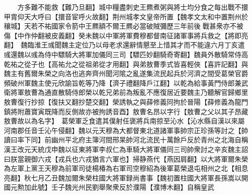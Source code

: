 　　方多難不能救【難乃旦翻】城中糧盡刺史王羆煮粥與將士均分食之每出戰不擐甲胄仰天大呼曰【擐音宦呼火故翻】荆州城孝文皇帝所置【魏孝文太和中置荆州於穰城】天若不祐國家令箭中王羆額不爾王羆必當破賊彌歷三年前後戰甚衆亦不被傷【中作仲翻被皮義翻】癸未魏以中軍將軍費穆都督南征諸軍事將兵救之【將即亮翻】　魏臨淮王彧聞魏主定位乃以母老求還辭情懇至上惜其才而不能違六月丁亥遣彧還魏以彧為侍中驃騎大將軍加儀同三司【驃匹妙翻騎奇寄翻】魏員外散騎常侍高乾祐之從子也【高祐允之從祖弟從才用翻】與弟敖曹季式皆喜輕俠【喜許記翻】與魏主有舊爾朱榮之向洛也逃奔齊州聞河隂之亂遂集流民起兵於河濟之間受葛榮官爵頻破州軍魏主使元欣諭旨乾等乃降【濟子禮翻降戶江翻】以乾為給事黃門侍郎兼武衛將軍敖曹為通直散騎侍郎榮以乾兄弟前為叛亂不應復居近要魏主乃聽解官歸鄉里敖曹復行抄掠【復扶又翻抄楚交翻】榮誘執之與薛修義同拘於晉陽【薛修義為龍門鎮將附蕭寶寅既降而反側故亦被拘誘音酉】敖曹名昂以字行【敖曹之父以其子昂藏敖曹故以為名字】　葛榮軍乏食遣其僕射任褒將兵南掠至沁水【沁水縣自漢以來屬河南郡任音壬沁午侵翻】魏以元天穆為大都督東北道諸軍事帥宗正珍孫等討之【帥讀曰率下同】前幽州平北府主簿河間邢杲帥河北流民十萬餘戶反於青州之北海自稱漢王改元天統戊申魏以征東將軍李叔仁為車騎大將軍儀同三司帥衆討之辛亥魏主詔曰朕當親御六戎【戎兵也六戎猶言六軍也】掃静燕代【燕因肩翻】以大將軍爾朱榮為左軍上黨王天穆為前軍司徒楊椿為右軍司空穆紹為後軍葛榮退屯相州之北【相息亮翻】秋七月乙丑魏加爾朱榮柱國大將軍録尚書事【魏初置柱國大將軍長孫嵩以開國元勲加此號】壬子魏光州民劉舉聚衆反於濮陽【濮博木翻】自稱皇武


